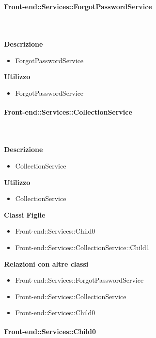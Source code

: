       \paragraph{Front-end::Services::ForgotPasswordService}
        
        \textbf{\\ \\ Descrizione} 
          \begin{itemize}
            \item[] ForgotPasswordService
          \end{itemize}      
        \textbf{Utilizzo}  
          \begin{itemize}
            \item[] ForgotPasswordService
          \end{itemize}
      \paragraph{Front-end::Services::CollectionService}
        
        \textbf{\\ \\ Descrizione} 
          \begin{itemize}
            \item[] CollectionService
          \end{itemize}      
        \textbf{Utilizzo}  
          \begin{itemize}
            \item[] CollectionService
          \end{itemize}
          \textbf{Classi Figlie}
          \begin{itemize}
              \item{Front-end::Services::Child0}
              \item{Front-end::Services::CollectionService::Child1}
          \end{itemize}
          \textbf{Relazioni con altre classi}
          \begin{itemize}
              \item{Front-end::Services::ForgotPasswordService}
              \item{Front-end::Services::CollectionService}
              \item{Front-end::Services::Child0}
          \end{itemize}
      \paragraph{Front-end::Services::Child0}
        
